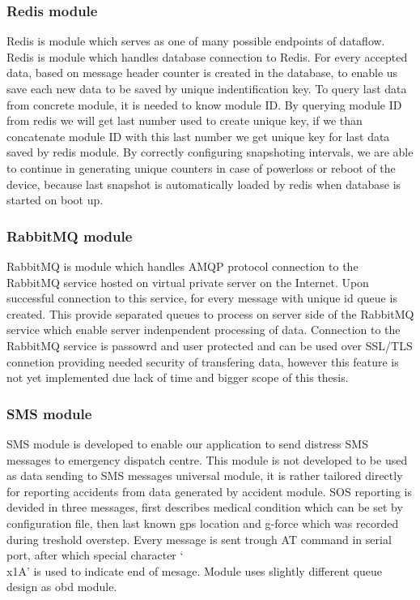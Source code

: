 \subsubsection{Redis module} %
\label{ssub:redis_module}
Redis is module which serves as one of many possible endpoints of dataflow. Redis is module which handles database connection to Redis. For every accepted data, based on message header counter is created in the database, to enable us save each new data to be saved by unique indentification key. To query last data from concrete module, it is needed to know module ID. By querying module ID from redis we will get last number used to create unique key, if we than concatenate module ID with this last number we get unique key for last data saved by redis module. By correctly configuring snapshoting intervals, we are able to continue in generating unique counters in case of powerloss or reboot of the device, because last snapshot is automatically loaded by redis when database is started on boot up.
\subsubsection{RabbitMQ module} %
\label{ssub:rabbitmq_module}
RabbitMQ is module which handles AMQP protocol connection to the RabbitMQ service hosted on virtual private server on the Internet. Upon successful connection to this service, for every message with unique id queue is created. This provide separated queues to process on server side of the RabbitMQ service which enable server indenpendent processing of data. Connection to the RabbitMQ service is passowrd and user protected and can be used over SSL/TLS connetion providing needed security of transfering data, however this feature is not yet implemented due lack of time and bigger scope of this thesis.
\subsubsection{SMS module} %
\label{ssub:sms_module}
SMS module is developed to enable our application to send distress SMS messages to emergency dispatch centre. This module is not developed to be used as data sending to SMS messages universal module, it is rather tailored directly for reporting accidents from data generated by accident module. SOS reporting is devided in three messages, first describes medical condition which can be set by configuration file, then last known gps location and g-force which was recorded during treshold overstep. Every message is sent trough AT command in serial port, after which special character `\\x1A' is used to indicate end of mesage. Module uses slightly different queue design as \gls{obd} module.
